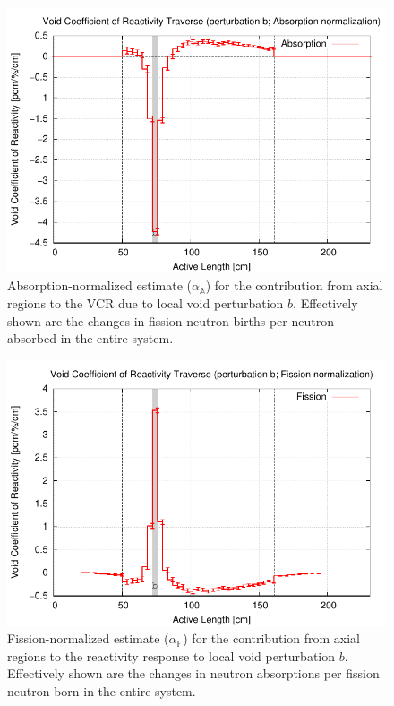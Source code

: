 \documentclass[11pt]{article}
\newcommand{\A}[0]{\mathbb{A}}
\newcommand{\F}[0]{\mathbb{F}}
\begin{document}
\clearpage
\begin{figure}[p]
  \centering
  \includegraphics[width=\textwidth, trim=0 0 0 0.275in, clip]{./img/Th-b-TraverseAlphaA.pdf}
  \caption{Absorption-normalized estimate ($\alpha_\A$) for the contribution from axial regions to the VCR due to local void perturbation $b$. Effectively shown are the changes in fission neutron births per neutron absorbed in the entire system.}
  \label{fig:alphaAR}
\end{figure}

\clearpage
\begin{figure}[p]
  \centering
  \includegraphics[width=\textwidth, trim=0 0 0 0.275in, clip]{./img/Th-b-TraverseAlphaF.pdf}
  \caption{Fission-normalized estimate ($\alpha_\F$) for the contribution from axial regions to the reactivity response to local void perturbation $b$. Effectively shown are the changes in neutron absorptions per fission neutron born in the entire system.}
  \label{fig:alphaFR}
\end{figure}
\end{document}
